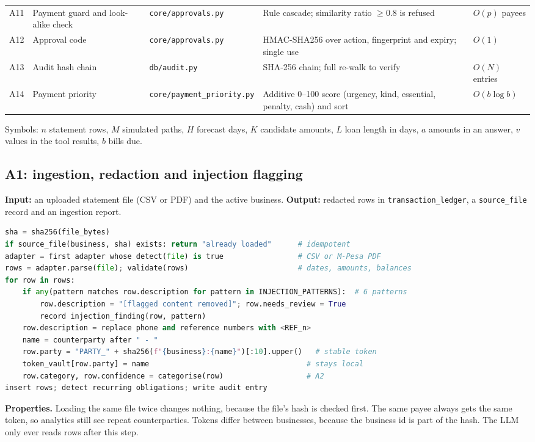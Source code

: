 \documentclass[10pt,a4paper]{article}
\newcommand{\code}[1]{\texttt{\small #1}}
\begin{document}
\begin{longtable}{@{}p{0.6cm}>{\raggedright\arraybackslash}p{3.1cm}>{\raggedright\arraybackslash}p{3.7cm}>{\raggedright\arraybackslash}p{4.3cm}>{\raggedright\arraybackslash}p{2.3cm}@{}}
A11 & Payment guard and look-alike check & \code{core/\allowbreak approvals.py} & Rule cascade; similarity ratio $\ge 0.8$ is refused & $O(p)$ payees\\
A12 & Approval code & \code{core/\allowbreak approvals.py} & HMAC-SHA256 over action, fingerprint and expiry; single use & $O(1)$\\
A13 & Audit hash chain & \code{db/\allowbreak audit.py} & SHA-256 chain; full re-walk to verify & $O(N)$ entries\\
A14 & Payment priority & \code{core/\allowbreak payment\_\allowbreak priority.py} & Additive 0--100 score (urgency, kind, essential, penalty, cash) and sort & $O(b\log b)$\\
\bottomrule
\end{longtable}
\endgroup
Symbols: $n$ statement rows, $M$ simulated paths, $H$ forecast days, $K$ candidate amounts, $L$ loan length in days, $a$ amounts in an answer, $v$ values in the tool results, $b$ bills due.

\subsection{A1: ingestion, redaction and injection flagging}
\textbf{Input:} an uploaded statement file (CSV or PDF) and the active business. \textbf{Output:} redacted rows in \code{transaction\_ledger}, a \code{source\_file} record and an ingestion report.
\begin{lstlisting}[language=Python,caption={A1 ingestion (simplified)}]
sha = sha256(file_bytes)
if source_file(business, sha) exists: return "already loaded"      # idempotent
adapter = first adapter whose detect(file) is true                 # CSV or M-Pesa PDF
rows = adapter.parse(file); validate(rows)                         # dates, amounts, balances
for row in rows:
    if any(pattern matches row.description for pattern in INJECTION_PATTERNS):  # 6 patterns
        row.description = "[flagged content removed]"; row.needs_review = True
        record injection_finding(row, pattern)
    row.description = replace phone and reference numbers with <REF_n>
    name = counterparty after " - "
    row.party = "PARTY_" + sha256(f"{business}:{name}")[:10].upper()   # stable token
    token_vault[row.party] = name                                    # stays local
    row.category, row.confidence = categorise(row)                   # A2
insert rows; detect recurring obligations; write audit entry
\end{lstlisting}
\textbf{Properties.} Loading the same file twice changes nothing, because the file's hash is checked first. The same payee always gets the same token, so analytics still see repeat counterparties. Tokens differ between businesses, because the business id is part of the hash. The LLM only ever reads rows after this step.
\end{document}
